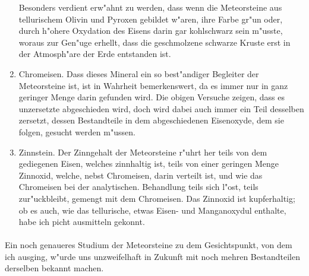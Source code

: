\documentclass[a4paper, 11pt, oneside]{article}
\begin{document}
\begin{enumerate}
    Besonders verdient erw"ahnt zu werden, dass wenn die Meteorsteine aus tellurischem Olivin und Pyroxen gebildet w"aren, ihre Farbe gr"un oder, durch h"ohere Oxydation des Eisens darin gar kohlschwarz sein m"usste, woraus zur Gen"uge erhellt, dass die geschmolzene schwarze Kruste erst in der Atmosph"are der Erde entstanden ist.
    \item Chromeisen. Dass dieses Mineral ein so best"andiger Begleiter der Meteorsteine ist, ist in Wahrheit bemerkenswert, da es immer nur in ganz geringer Menge darin gefunden wird. Die obigen Versuche zeigen, dass es unzersetzte abgeschieden wird, doch wird dabei auch immer ein Teil desselben zersetzt, dessen Bestandteile in dem abgeschiedenen Eisenoxyde, dem sie folgen, gesucht werden m"ussen.
    \item Zinnstein. Der Zinngehalt der Meteorsteine r"uhrt her teils von dem gediegenen Eisen, welches zinnhaltig ist, teils von einer geringen Menge Zinnoxid, welche, nebst Chromeisen, darin verteilt ist, und wie das Chromeisen bei der analytischen. Behandlung teils sich l"ost, teils zur"uckbleibt, gemengt mit dem Chromeisen. Das Zinnoxid ist kupferhaltig; ob es auch, wie das tellurische, etwas Eisen- und Manganoxydul enthalte, habe ich picht ausmitteln gekonnt.
\end{enumerate}
\paragraph{}
Ein noch genaueres Studium der Meteorsteine zu dem Gesichtspunkt, von dem ich ausging, w"urde uns unzweifelhaft in Zukunft mit noch mehren Bestandteilen derselben bekannt machen.
\end{document}
